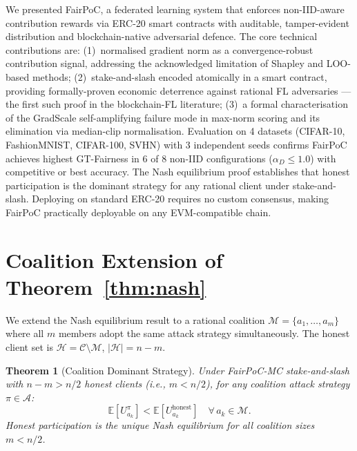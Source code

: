 \documentclass[journal]{IEEEtran}
\newtheorem{theorem}{Theorem}
\theoremstyle{definition}
\theoremstyle{remark}
\begin{document}
We presented FairPoC, a federated learning system that enforces
non-IID-aware contribution rewards via ERC-20 smart contracts with
auditable, tamper-evident distribution and blockchain-native
adversarial defence.
The core technical contributions are:
(1)~normalised gradient norm as a convergence-robust contribution
signal, addressing the acknowledged limitation of Shapley and
LOO-based methods;
(2)~stake-and-slash encoded atomically in a smart contract,
providing formally-proven economic deterrence against rational FL
adversaries --- the first such proof in the blockchain-FL literature;
(3)~a formal characterisation of the GradScale self-amplifying
failure mode in max-norm scoring and its elimination via
median-clip normalisation.
Evaluation on 4 datasets (CIFAR-10, FashionMNIST, CIFAR-100, SVHN)
with 3 independent seeds confirms FairPoC achieves highest
GT-Fairness in 6 of 8 non-IID configurations
($\alpha_D \leq 1.0$) with competitive or best accuracy.
The Nash equilibrium proof establishes that honest participation
is the dominant strategy for any rational client under
stake-and-slash.
Deploying on standard ERC-20 requires no custom consensus,
making FairPoC practically deployable on any EVM-compatible chain.




\appendix

\section{Coalition Extension of Theorem~\ref{thm:nash}}
\label{appendix:coalition}

We extend the Nash equilibrium result to a rational coalition
$\mathcal{M} = \{a_1, \ldots, a_m\}$ where all $m$ members
adopt the same attack strategy simultaneously.
The honest client set is $\mathcal{H} = \mathcal{C} \setminus \mathcal{M}$,
$|\mathcal{H}| = n - m$.

\begin{theorem}[Coalition Dominant Strategy]
\label{thm:coalition}
Under FairPoC-MC stake-and-slash with $n{-}m > n/2$ honest
clients (i.e., $m < n/2$), for any coalition attack strategy
$\pi \in \mathcal{A}$:
\begin{equation}
  \mathbb{E}[U_{a_k}^\pi] < \mathbb{E}[U_{a_k}^{\mathrm{honest}}]
  \quad \forall\, a_k \in \mathcal{M}.
\end{equation}
Honest participation is the unique Nash equilibrium for all
coalition sizes $m < n/2$.
\end{theorem}
\end{document}
